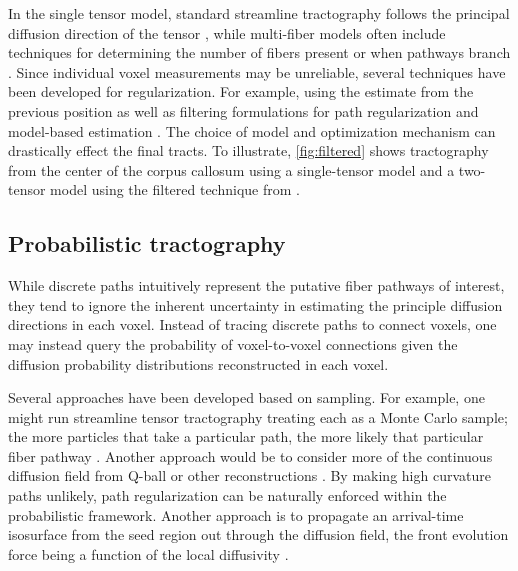\documentclass[final,hyperref]{gatech-thesis}
\begin{document}
In the single tensor model, standard streamline tractography follows the
principal diffusion direction of the tensor \cite{Mori2002}, while multi-fiber
models often include techniques for determining the number of fibers present
or when pathways branch \cite{Hagmann2004,Kreher2005,Guo2006}.
%
Since individual voxel measurements may be unreliable, several techniques have
been developed for regularization.  For example, using the estimate from the
previous position \cite{Lazar2003,Zhukov2002} as well as filtering
formulations for path regularization \cite{Gossl2002} and model-based
estimation \cite{Malcolm2009ipmi}.
%
The choice of model and optimization mechanism can drastically effect the
final tracts.  To illustrate, \autoref{fig:filtered} shows tractography from
the center of the corpus callosum using a single-tensor model and a two-tensor
model using the filtered technique from \cite{Malcolm2009ipmi}.



\subsection{Probabilistic tractography}

While discrete paths intuitively represent the putative fiber pathways of
interest, they tend to ignore the inherent uncertainty in estimating the
principle diffusion directions in each voxel.
%
Instead of tracing discrete paths to connect voxels, one may instead query the
probability of voxel-to-voxel connections given the diffusion probability
distributions reconstructed in each voxel.

Several approaches have been developed based on sampling.  For example, one
might run streamline tensor tractography treating each as a Monte Carlo
sample; the more particles that take a particular path, the more likely that
particular fiber pathway \cite{Koch2002,Behrens2003,Parker2003,Bjornemo2002}.
Another approach would be to consider more of the continuous diffusion field
from Q-ball or other reconstructions
\cite{Tuch2000,Batchelor2001,Perrin2005,Parker2005,Friman2006,Zhang2009}.  By
making high curvature paths unlikely, path regularization can be naturally
enforced within the probabilistic framework.
%
Another approach is to propagate an arrival-time isosurface from the seed
region out through the diffusion field, the front evolution force being a
function of the local diffusivity
\cite{Batchelor2001,Campbell2005,Tournier2003}.
\end{document}
